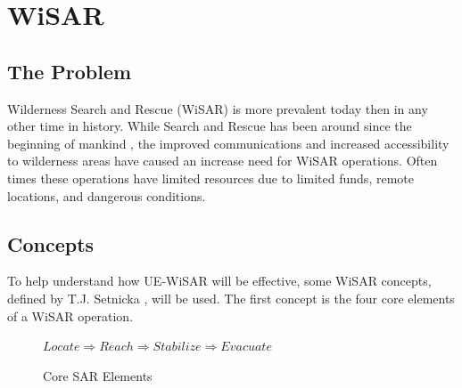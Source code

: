   
\section{WiSAR}
\subsection{The Problem}
Wilderness Search and Rescue (WiSAR) is more prevalent today then in any other
time in history.  While Search and Rescue has been around since the beginning of
mankind \cite[p.~13]{setnicka1980}, the improved communications and increased
accessibility to wilderness areas have caused an increase need for WiSAR
operations.  Often times these operations have limited resources due to limited
funds, remote locations, and dangerous conditions.


\subsection{Concepts}

To help understand how UE-WiSAR will be effective, some WiSAR
concepts, defined by T.J. Setnicka \cite[p.~35]{setnicka1980}, will be used. 
The first concept is the four core elements of a WiSAR operation.
\begin{figure}[h]
	\begin{center}
		\begin{math}
			Locate \Rightarrow Reach \Rightarrow Stabilize \Rightarrow Evacuate
		\end{math}
	\end{center}
	\caption{Core SAR Elements}
\end{figure}

